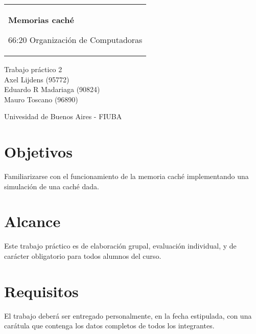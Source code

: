 \documentclass[11pt,a4paper]{article}
\begin{document}

\begin{titlepage}
  \noindent%
  \begin{tabular}{@{}p{\textwidth}@{}}
    \vspace{0.2cm}
    \begin{center}
    \Huge{\textbf{
      Memorias caché
    }}
    \end{center}
    \begin{center}
      \Large{
         66:20 Organizaci\'on de Computadoras
      }
    \end{center}
    \vspace{0.2cm}\\
  \end{tabular}
  \vspace{4 cm}
  \begin{center}
    {\large
      Trabajo práctico 2
    }\\
    \vspace{0.6cm}
    {\Large
      Axel Lijdens (95772)\\
      Eduardo R Madariaga (90824)\\
      Mauro Toscano (96890)
    }
  \end{center}
  \vfill
  \begin{center}
  Univesidad de Buenos Aires - FIUBA
  \end{center}
\end{titlepage}


\tableofcontents
\pagebreak

\section{Objetivos}

Familiarizarse con el funcionamiento de la memoria caché implementando una simulación de una caché dada.

\section{Alcance}

Este trabajo práctico es de elaboración grupal, evaluación individual, y de carácter obligatorio para todos alumnos del curso.

\section{Requisitos}

El trabajo deberá ser entregado personalmente, en la fecha estipulada, con una carátula que contenga los datos completos de todos los integrantes.
\end{document}
